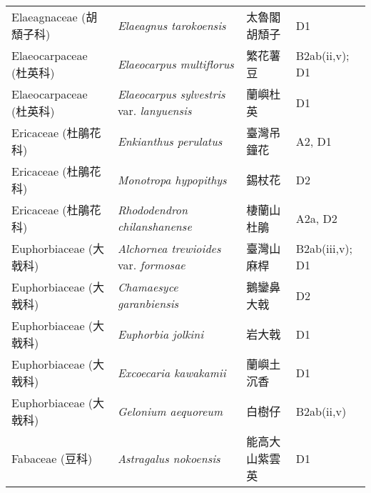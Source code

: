 \begin{longtable}{p{3cm}p{5cm}p{3cm}p{4cm}}
    Elaeagnaceae (胡頹子科) & \textit{Elaeagnus tarokoensis}  & 太魯閣胡頹子 & D1 \index{Elaeagnus@\textit{Elaeagnus}!tarokoensis@\textit{tarokoensis}}  \index{太魯閣胡頹子} \\
    Elaeocarpaceae (杜英科) & \textit{Elaeocarpus multiflorus}  & 繁花薯豆 & B2ab(ii,v); D1 \index{Elaeocarpus@\textit{Elaeocarpus}!multiflorus@\textit{multiflorus}}  \index{繁花薯豆} \\
    Elaeocarpaceae (杜英科) & \textit{Elaeocarpus sylvestris} var. \textit{lanyuensis}  & 蘭嶼杜英 & D1 \index{Elaeocarpus@\textit{Elaeocarpus}!sylvestris@\textit{sylvestris}!var. lanyuensis@var. \textit{lanyuensis}}  \index{蘭嶼杜英} \\
    Ericaceae (杜鵑花科) & \textit{Enkianthus perulatus}  & 臺灣吊鐘花 & A2, D1 \index{Enkianthus@\textit{Enkianthus}!perulatus@\textit{perulatus}}  \index{臺灣吊鐘花} \\
    Ericaceae (杜鵑花科) & \textit{Monotropa hypopithys}  & 錫杖花 & D2 \index{Monotropa@\textit{Monotropa}!hypopithys@\textit{hypopithys}}  \index{錫杖花} \\
    Ericaceae (杜鵑花科) & \textit{Rhododendron chilanshanense}  & 棲蘭山杜鵑 & A2a, D2 \index{Rhododendron@\textit{Rhododendron}!chilanshanense@\textit{chilanshanense}}  \index{棲蘭山杜鵑} \\
    Euphorbiaceae (大戟科) & \textit{Alchornea trewioides} var. \textit{formosae}  & 臺灣山麻桿 & B2ab(iii,v); D1 \index{Alchornea@\textit{Alchornea}!trewioides@\textit{trewioides}!var. formosae@var. \textit{formosae}}  \index{臺灣山麻桿} \\
    Euphorbiaceae (大戟科) & \textit{Chamaesyce garanbiensis}  & 鵝鑾鼻大戟 & D2 \index{Chamaesyce@\textit{Chamaesyce}!garanbiensis@\textit{garanbiensis}}  \index{鵝鑾鼻大戟} \\
    Euphorbiaceae (大戟科) & \textit{Euphorbia jolkini}  & 岩大戟 & D1 \index{Euphorbia@\textit{Euphorbia}!jolkini@\textit{jolkini}}  \index{岩大戟} \\
    Euphorbiaceae (大戟科) & \textit{Excoecaria kawakamii}  & 蘭嶼土沉香 & D1 \index{Excoecaria@\textit{Excoecaria}!kawakamii@\textit{kawakamii}}  \index{蘭嶼土沉香} \\
    Euphorbiaceae (大戟科) & \textit{Gelonium aequoreum}  & 白樹仔 & B2ab(ii,v) \index{Gelonium@\textit{Gelonium}!aequoreum@\textit{aequoreum}}  \index{白樹仔} \\
    Fabaceae (豆科) & \textit{Astragalus nokoensis}  & 能高大山紫雲英 & D1 \index{Astragalus@\textit{Astragalus}!nokoensis@\textit{nokoensis}}  \index{能高大山紫雲英} \\

\end{longtable}
